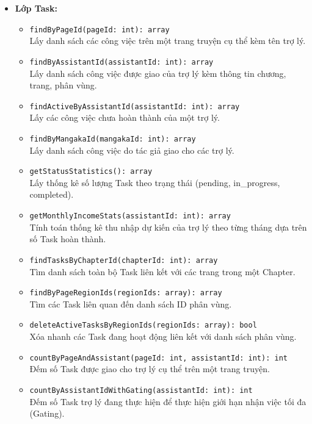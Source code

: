 \begin{itemize}
    \item \textbf{Lớp Task:}
    \begin{itemize}
        \item \texttt{findByPageId(pageId: int): array}\\
            Lấy danh sách các công việc trên một trang truyện cụ thể kèm tên trợ lý.
        \item \texttt{findByAssistantId(assistantId: int): array}\\
            Lấy danh sách công việc được giao của trợ lý kèm thông tin chương, trang, phân vùng.
        \item \texttt{findActiveByAssistantId(assistantId: int): array}\\
            Lấy các công việc chưa hoàn thành của một trợ lý.
        \item \texttt{findByMangakaId(mangakaId: int): array}\\
            Lấy danh sách công việc do tác giả giao cho các trợ lý.
        \item \texttt{getStatusStatistics(): array}\\
            Lấy thống kê số lượng Task theo trạng thái (pending, in\_progress, completed).
        \item \texttt{getMonthlyIncomeStats(assistantId: int): array}\\
            Tính toán thống kê thu nhập dự kiến của trợ lý theo từng tháng dựa trên số Task hoàn thành.
        \item \texttt{findTasksByChapterId(chapterId: int): array}\\
            Tìm danh sách toàn bộ Task liên kết với các trang trong một Chapter.
        \item \texttt{findByPageRegionIds(regionIds: array): array}\\
            Tìm các Task liên quan đến danh sách ID phân vùng.
        \item \texttt{deleteActiveTasksByRegionIds(regionIds: array): bool}\\
            Xóa nhanh các Task đang hoạt động liên kết với danh sách phân vùng.
        \item \texttt{countByPageAndAssistant(pageId: int, assistantId: int): int}\\
            Đếm số Task được giao cho trợ lý cụ thể trên một trang truyện.
        \item \texttt{countByAssistantIdWithGating(assistantId: int): int}\\
            Đếm số Task trợ lý đang thực hiện để thực hiện giới hạn nhận việc tối đa (Gating).
    \end{itemize}


\end{itemize}
